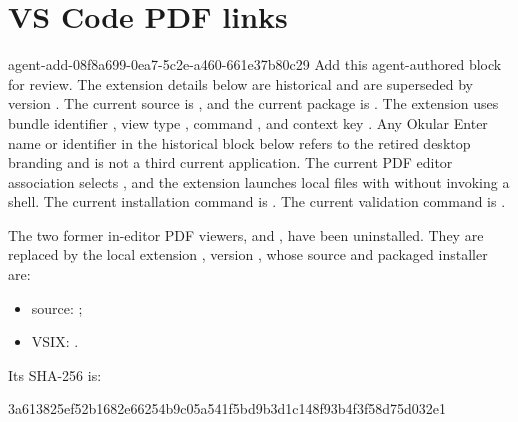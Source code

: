 \section*{VS Code PDF links}
\agentProposedEdit
  {agent-add-08f8a699-0ea7-5c2e-a460-661e37b80c29}
  {Add this agent-authored block for review.}
  {}
  {The extension details below are historical and are superseded by  version .
The current source is , and the current package is .
The extension uses bundle identifier , view type , command , and context key .
Any Okular Enter name or  identifier in the historical block below refers to the retired desktop branding and is not a third current application.
The current PDF editor association selects , and the extension launches local files with  without invoking a shell.
The current installation command is .
The current validation command is .}

The two former in-editor PDF viewers,  and , have been uninstalled.
They are replaced by the local extension , version , whose source and packaged installer are:
\begin{itemize}
  \item source: ;
  \item VSIX: .
\end{itemize}
Its SHA-256 is:
\begin{DocCode}
3a613825ef52b1682e66254b9c05a541f5bd9b3d1c148f93b4f3f58d75d032e1
\end{DocCode}

